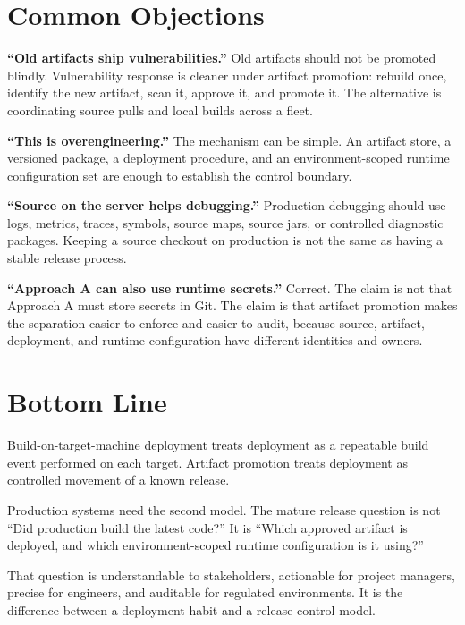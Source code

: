 \documentclass[11pt]{article}
\begin{document}
\section{Common Objections}

\textbf{``Old artifacts ship vulnerabilities.''} Old artifacts should not be promoted blindly. Vulnerability response is cleaner under artifact promotion: rebuild once, identify the new artifact, scan it, approve it, and promote it. The alternative is coordinating source pulls and local builds across a fleet.

\textbf{``This is overengineering.''} The mechanism can be simple. An artifact store, a versioned package, a deployment procedure, and an environment-scoped runtime configuration set are enough to establish the control boundary.

\textbf{``Source on the server helps debugging.''} Production debugging should use logs, metrics, traces, symbols, source maps, source jars, or controlled diagnostic packages. Keeping a source checkout on production is not the same as having a stable release process.

\textbf{``Approach A can also use runtime secrets.''} Correct. The claim is not that Approach A must store secrets in Git. The claim is that artifact promotion makes the separation easier to enforce and easier to audit, because source, artifact, deployment, and runtime configuration have different identities and owners.

\section{Bottom Line}

Build-on-target-machine deployment treats deployment as a repeatable build event performed on each target. Artifact promotion treats deployment as controlled movement of a known release.

Production systems need the second model. The mature release question is not ``Did production build the latest code?'' It is ``Which approved artifact is deployed, and which environment-scoped runtime configuration is it using?''

That question is understandable to stakeholders, actionable for project managers, precise for engineers, and auditable for regulated environments. It is the difference between a deployment habit and a release-control model.
\end{document}
